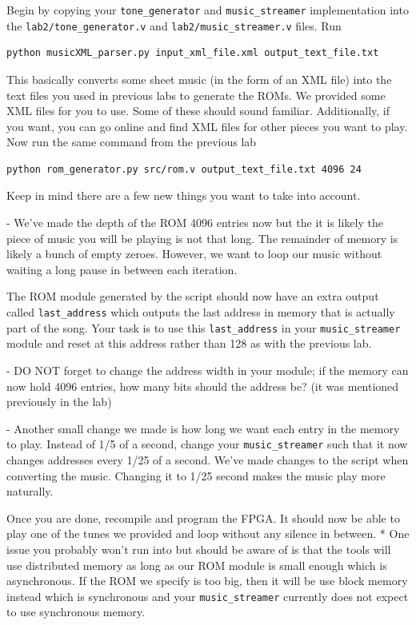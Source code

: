 \documentclass[11pt]{article}
\begin{document}
Begin by copying your \verb|tone_generator| and \verb|music_streamer| implementation into the \newline \verb|lab2/tone_generator.v| and \verb|lab2/music_streamer.v| files. Run 
\begin{verbatim}
python musicXML_parser.py input_xml_file.xml output_text_file.txt
\end{verbatim}
This basically converts some sheet music (in the form of an XML file) into the text files you used in previous labs to generate the ROMs. We provided some XML files for you to use. Some of these should sound familiar. Additionally, if you want, you can go online and find XML files for other pieces you want to play. Now run the same command from the previous lab
\begin{verbatim}
python rom_generator.py src/rom.v output_text_file.txt 4096 24
\end{verbatim}

Keep in mind there are a few new things you want to take into account. 

- We've made the depth of the ROM 4096 entries now but the it is likely the piece of music you will be playing is not that long. The remainder of memory is likely a bunch of empty zeroes. However, we want to loop our music without waiting a long pause in between each iteration.

The ROM module generated by the script should now have an extra output called \verb|last_address| which outputs the last address in memory that is actually part of the song. Your task is to use this \verb|last_address| in your \verb|music_streamer| module and reset at this address rather than 128 as with the previous lab.

- DO NOT forget to change the address width in your module; if the memory can now hold 4096 entries, how many bits should the address be? (it was mentioned previously in the lab)

- Another small change we made is how long we want each entry in the memory to play. Instead of 1/5 of a second, change your \verb|music_streamer| such that it now changes addresses every 1/25 of a second. We've made changes to the script when converting the music. Changing it to 1/25 second makes the music play more naturally.

Once you are done, recompile and program the FPGA. It should now be able to play one of the tunes we provided and loop without any silence in between.
\newline
* One issue you probably won't run into but should be aware of is that the tools will use distributed memory as long as our ROM module is small enough which is asynchronous. If the ROM we specify is too big, then it will be use block memory instead which is synchronous and your \verb|music_streamer| currently does not expect to use synchronous memory.
\end{document}
